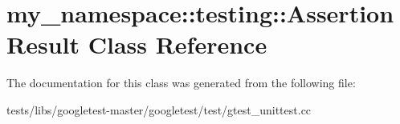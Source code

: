 \hypertarget{classmy__namespace_1_1testing_1_1AssertionResult}{}\section{my\+\_\+namespace\+:\+:testing\+:\+:Assertion\+Result Class Reference}
\label{classmy__namespace_1_1testing_1_1AssertionResult}


The documentation for this class was generated from the following file\+:\begin{DoxyCompactItemize}
\item 
tests/libs/googletest-\/master/googletest/test/gtest\+\_\+unittest.\+cc\end{DoxyCompactItemize}
